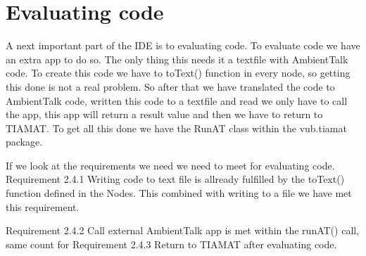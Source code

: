 \documentclass[a4paper,12pt]{report}
\begin{document}
\section{Evaluating code}
A next important part of the IDE is to evaluating code. To evaluate code we have an extra app to do so. The only thing this needs 
it a textfile with AmbientTalk code. To create this code we have to toText() function in every node, so getting this done is not a 
real problem. So after that we have translated the code to AmbientTalk code, written this code to a textfile and read we only have to
call the app, this app will return a result value and then we have to return to TIAMAT. To get all this done we have the RunAT class 
within the vub.tiamat package. 

If we look at the requirements we need we need to meet for evaluating code. Requirement 2.4.1 Writing code to text file is allready
fulfilled by the toText() function defined in the Nodes. This combined with writing to a file we have met this requirement.

Requirement 2.4.2 Call external AmbientTalk app is met within the runAT() call, same count for Requirement 2.4.3 Return to TIAMAT after
evaluating code. 
\end{document}
